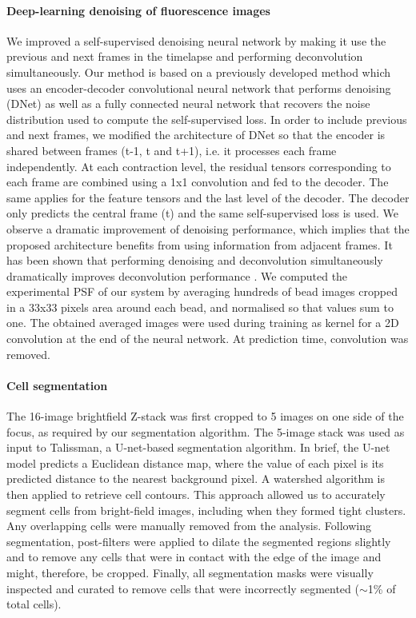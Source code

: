 \paragraph*{Deep-learning denoising of fluorescence images}
We improved a self-supervised denoising neural network by making it use the previous and next frames in the timelapse and performing deconvolution simultaneously. Our method is based on a previously developed method \cite{Ollion2021} which uses an encoder-decoder convolutional neural network that performs denoising (DNet) as well as a fully connected neural network that recovers the noise distribution used to compute the self-supervised loss. In order to include previous and next frames, we modified the architecture of DNet so that the encoder is shared between frames (t-1, t and t+1), i.e. it processes each frame independently. At each contraction level, the residual tensors corresponding to each frame are combined using a 1x1 convolution and fed to the decoder. The same applies for the feature tensors and the last level of the decoder. The decoder only predicts the central frame (t) and the same self-supervised loss is used. We observe a dramatic improvement of denoising performance, which implies that the proposed architecture benefits from using information from adjacent frames. It has been shown that performing denoising and deconvolution simultaneously dramatically improves deconvolution performance \cite{Kobayashi2020}. We computed the experimental PSF of our system by averaging hundreds of bead images cropped in a 33x33 pixels area around each bead, and normalised so that values sum to one. The obtained averaged images were used during training as kernel for a 2D convolution at the end of the neural network. At prediction time, convolution was removed.

\paragraph{Cell segmentation}
The 16-image brightfield Z-stack was first cropped to 5 images on one side of the focus, as required by our segmentation algorithm. The 5-image stack was used as input to Talissman, a U-net-based segmentation algorithm. In brief, the U-net model predicts a Euclidean distance map, where the value of each pixel is its predicted distance to the nearest background pixel. A watershed algorithm is then applied to retrieve cell contours. This approach allowed us to accurately segment cells from bright-field images, including when they formed tight clusters. Any overlapping cells were manually removed from the analysis. Following segmentation, post-filters were applied to dilate the segmented regions slightly and to remove any cells that were in contact with the edge of the image and might, therefore, be cropped. Finally, all segmentation masks were visually inspected and curated to remove cells that were incorrectly segmented ($\sim$1\% of total cells).

